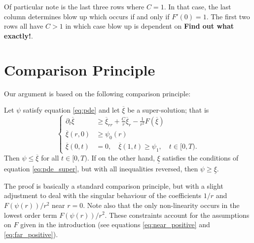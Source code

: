 \documentclass{amsart}
\begin{document}
Of particular note is the last three rows where \(C = 1\). In that case, the last column determines blow up which occurs if and only if \(F'(0) = 1\). The first two rows all have \(C > 1\) in which case blow up is dependent on \textbf{Find out what exactly!}.


\section{Comparison Principle}

Our argument is based on the following comparison principle:

\begin{thm}
Let \(\psi\) satisfy equation \eqref{eq:pde} and let \(\overline{\xi}\) be a super-solution; that is
\begin{equation}
\label{eq:pde_super}
\begin{cases}
\partial_t \overline{\xi} &\geq \overline{\xi}_{rr} + \frac{C}{r} \overline{\xi}_r - \frac{1}{r^2} F(\overline{\xi}) \\
\overline{\xi}(r, 0) &\geq \psi_0(r) \\
\overline{\xi}(0, t) &= 0, \quad \overline{\xi}(1, t) \geq \psi_1, \quad t \in [0, T).
\end{cases}
\end{equation}
Then \(\psi \leq \overline{\xi}\) for all \(t \in [0, T)\). If on the other hand, \(\underline{\xi}\) satisfies the conditions of equation \eqref{eq:pde_super}, but with all inequalities reversed, then \(\psi \geq \underline{\xi}\).
\end{thm}

The proof is basically a standard comparison principle, but with a slight adjustment to deal with the singular behaviour of the coefficients \(1/r\) and \(F(\psi(r))/r^2\) near \(r=0\). Note also that the only non-linearity occurs in the lowest order term \(F(\psi(r))/r^2\). These constraints account for the assumptions on \(F\) given in the introduction (see equations \eqref{eq:near_positive} and \eqref{eq:far_positive}).
\end{document}
